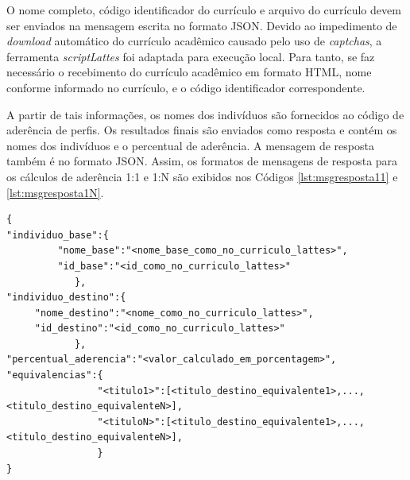 O nome completo, código identificador do currículo e arquivo do currículo devem ser enviados na mensagem escrita no formato JSON. Devido ao impedimento de \textit{download} automático do currículo acadêmico causado pelo uso de \textit{captchas}, a ferramenta \textit{scriptLattes} foi adaptada para execução local. Para tanto, se faz necessário o recebimento do currículo acadêmico em formato HTML, nome conforme informado no currículo, e o código identificador correspondente.

A partir de tais informações, os nomes dos indivíduos são fornecidos ao código de aderência de perfis. Os resultados finais são enviados como resposta e contém os nomes dos indivíduos e o percentual de aderência. A mensagem de resposta também é no formato JSON. Assim, os formatos de mensagens de resposta para os cálculos de aderência 1:1 e 1:N são exibidos nos Códigos \ref{lst:msgresposta11} e \ref{lst:msgresposta1N}.



\begin{lstlisting}[caption={Formato de mensagem de resposta(1:1).},label={lst:msgresposta11}]
{
"individuo_base":{
         "nome_base":"<nome_base_como_no_curriculo_lattes>",
         "id_base":"<id_como_no_curriculo_lattes>"
            },
"individuo_destino":{
     "nome_destino":"<nome_como_no_curriculo_lattes>",
     "id_destino":"<id_como_no_curriculo_lattes>"
            },
"percentual_aderencia":"<valor_calculado_em_porcentagem>",
"equivalencias":{
				"<titulo1>":[<titulo_destino_equivalente1>,...,<titulo_destino_equivalenteN>],
				"<tituloN>":[<titulo_destino_equivalente1>,...,<titulo_destino_equivalenteN>],
				}
}


\end{lstlisting}



